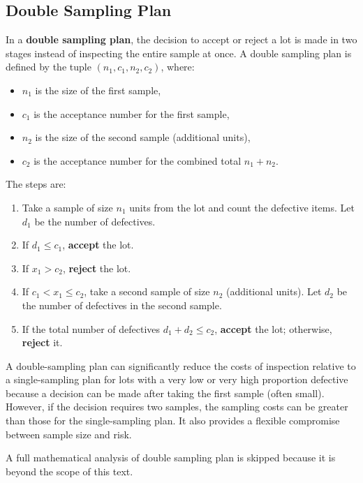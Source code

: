 \documentclass[twoside]{book}
\begin{document}
\subsection{Double Sampling Plan}

In a \textbf{double sampling plan}, the decision to accept or reject a lot is made in two stages instead of inspecting the entire sample at once. A double sampling plan is defined by the tuple $(n_1, c_1, n_2, c_2)$, where:
\begin{itemize}
    \item $n_1$ is the size of the first sample,
    \item $c_1$ is the acceptance number for the first sample,
    \item $n_2$ is the size of the second sample (additional units),
    \item $c_2$ is the acceptance number for the combined total $n_1 + n_2$.
\end{itemize}

The steps are:
\begin{textbox}
\begin{enumerate}
    \item Take a sample of size $n_1$ units from the lot and count the defective items. Let $d_1$ be the number of defectives.
    \item If $d_1 \leq c_1$, \textbf{accept} the lot.
    \item If $x_1 > c_2$, \textbf{reject} the lot.
    \item If $c_1 < x_1 \leq c_2$, take a second sample of size $n_2$ (additional units). Let $d_2$ be the number of defectives in the second sample.
    \item If the total number of defectives $d_1 + d_2 \leq c_2$, \textbf{accept} the lot; otherwise, \textbf{reject} it.
\end{enumerate}
\end{textbox}

A double-sampling plan can significantly reduce the costs of inspection relative to a single-sampling plan for lots with a very low or very high proportion defective because a decision can be made after taking the first sample (often small). However, if the decision requires two samples, the sampling costs can be greater than those for the single-sampling plan. It also provides a flexible compromise between sample size and risk.

A full mathematical analysis of double sampling plan is skipped because it is beyond the scope of this text.
\end{document}

